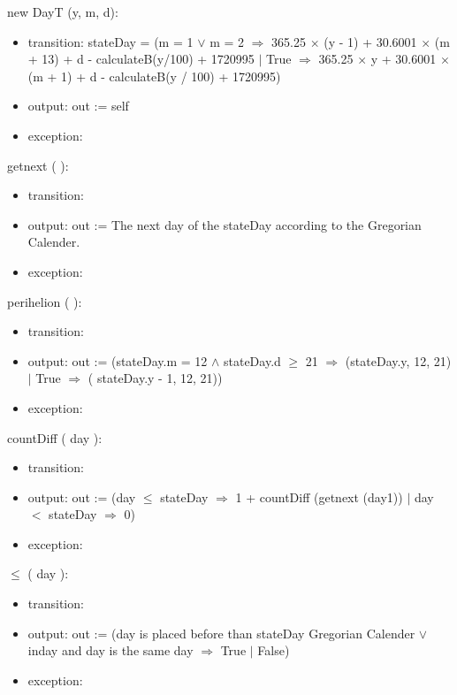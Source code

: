 \documentclass[12pt, titlepage]{article}
\begin{document}
\noindent  new DayT (y, m, d):
\begin{itemize}
\item transition:  stateDay = (m = 1 $\lor$ m = 2 $\Rightarrow $ 365.25 $\times$ (y - 1) + 30.6001 $\times$ (m + 13) + d - calculateB(y/100) +  1720995 $|$ True $\Rightarrow $ 365.25 $\times$ y + 30.6001 $\times$ (m + 1) + d - calculateB(y / 100) +  1720995)\\

\item output: out := self
\item exception: 
\end{itemize}

\noindent  getnext ( ):
\begin{itemize}
\item transition: 
\item output: out := The next day of the  stateDay according to the Gregorian Calender.
\item exception:
\end{itemize}

\noindent  perihelion ( ):
\begin{itemize}
\item transition: 
\item output: out := (stateDay.m = 12 $	\wedge$ stateDay.d $\geq	$ 21 $\Rightarrow$  (stateDay.y, 12, 21) $|$ True $\Rightarrow$ ( stateDay.y - 1, 12, 21))
\item exception:
\end{itemize}

\noindent  countDiff ( day ):
\begin{itemize}
\item transition: 
\item output: out := (day $\leq$ stateDay $\Rightarrow$ 1 + countDiff (getnext (day1)) $|$ day $<$  stateDay $\Rightarrow$ 0)
\item exception:
\end{itemize}


\noindent  $\leq$ ( day ):
\begin{itemize}
\item transition: 
\item output: out := (day is placed before than stateDay Gregorian Calender $\lor	$ inday and day is the same day $\Rightarrow$ True $|$ False)
\item exception:
\end{itemize}
\end{document}
